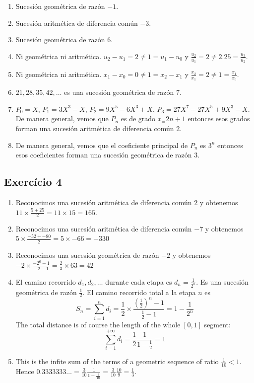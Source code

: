 \begin{enumerate}
\item Sucesión geométrica de razón $-1$.
\item Sucesión aritmética de diferencia común $-3$.
\item Sucesión geométrica de razón $6$.
\item Ni geométrica ni aritmética. $u_2 - u_1 = 2 \neq 1 = u_1 - u_0$ y
  $\frac{u_2}{u_1} = 2 \neq 2.25 = \frac{u_3}{u_2}$.
\item Ni geométrica ni aritmética. $x_1 - x_0 = 0 \neq 1 = x_2 - x_1$
  y $\frac{x_2}{x_1} = 2 \neq 1 = \frac{x_1}{x_0}$.
\item $21, 28, 35, 42, \ldots$ es una sucesión geométrica de razón $7$.
\item $P_0 = X$, $P_1 = 3X^3 - X$, $P_2 = 9X^5-6X^3+X$,
  $P_3 = 27X^7-27X^5+9X^3-X$. De manera general, vemos que $P_n$ es de grado
  $x_=2n+1$ entonces esos grados forman una sucesión aritmética de
  diferencia común $2$.
\item De manera general, vemos que el coeficiente principal de $P_n$ es
  $3^n$ entonces esos coeficientes forman una sucesión geométrica de
  razón $3$.
\end{enumerate}

\subsection*{Exercício 4}

\begin{enumerate}
\item Reconocimos una sucesión aritmética de diferencia común 2 y obtenemos
  $11 \times \frac{5 + 25}{2} = 11 \times 15 = 165$.
\item Reconocimos una sucesión aritmética de diferencia común $-7$ y obtenemos
  $5 \times \frac{-52 + -80}{2} = 5 \times -66 = -330$
\item Reconocimos una sucesión geométrica de razón $-2$ y obtenemos
  $-2 \times \frac{{-2}^{6} - 1}{-2 - 1} = \frac{2}{3} \times 63 = 42$
\item El camino recorrido $d_1, d_2, \ldots$ durante cada etapa es
  $d_n = \frac{1}{2^n}$. Es una sucesión geométrica de razón $\frac{1}{2}$. El
  camino recorrido total a la etapa $n$ es
  $$
  S_n = \sum_{i=1}^n d_i = \frac{1}{2} \times \frac{\left(\frac{1}{2}\right)^n - 1}{\frac{1}{2} - 1} = 1 - \frac{1}{2^n}
  $$
  The total distance is of course the length of the whole $[0,1]$ segment:
  $$
  \sum_{i=1}^{+\infty} d_i = \frac{1}{2} \frac{1}{1 - \frac{1}{2}} = 1
  $$
\item This is the infite sum of the terms of a geometric sequence of
  ratio $\frac{1}{10} < 1$. Hence
  $0.3333333\ldots = \frac{3}{10} \frac{1}{1-\frac{1}{10}} =
  \frac{3}{10} \frac{10}{9} = \frac{1}{3}$.
\end{enumerate}

